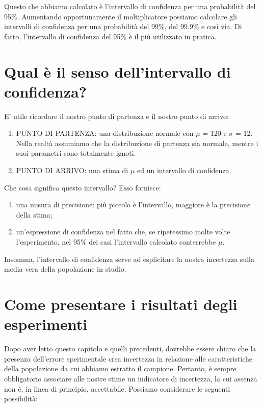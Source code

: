 \documentclass[a4paper,12pt,oneside]{book}
\providecommand{\tightlist}{%
  \setlength{\itemsep}{0pt}\setlength{\parskip}{0pt}}
\begin{document}
Questo che abbiamo calcolato è l'intervallo di confidenza per una probabilità del 95\%. Aumentando opportunamente il moltiplicatore possiamo calcolare gli intervalli di confidenza per una probabilità del 99\%, del 99.9\% e così via. Di fatto, l'intervallo di confidenza del 95\% è il più utilizzato in pratica.

\hypertarget{qual-uxe8-il-senso-dellintervallo-di-confidenza}{%
\section{Qual è il senso dell'intervallo di confidenza?}\label{qual-uxe8-il-senso-dellintervallo-di-confidenza}}

E' utile ricordare il nostro punto di partenza e il nostro punto di arrivo:

\begin{enumerate}
\def\labelenumi{\arabic{enumi}.}
\tightlist
\item
  PUNTO DI PARTENZA: una distribuzione normale con \(\mu\) = 120 e \(\sigma\) = 12. Nella realtà assumiamo che la distribuzione di partenza sia normale, mentre i suoi parametri sono totalmente ignoti.
\item
  PUNTO DI ARRIVO: una stima di \(\mu\) ed un intervallo di confidenza.
\end{enumerate}

Che cosa significa questo intervallo? Esso fornisce:

\begin{enumerate}
\def\labelenumi{\arabic{enumi}.}
\tightlist
\item
  una misura di precisione: più piccolo è l'intervallo, maggiore è la precisione della stima;
\item
  un'espressione di confidenza nel fatto che, se ripetessimo molte volte l'esperimento, nel 95\% dei casi l'intervallo calcolato conterrebbe \(\mu\).
\end{enumerate}

Insomma, l'intervallo di confidenza serve ad esplicitare la nostra incertezza sulla media vera della popolazione in studio.

\hypertarget{come-presentare-i-risultati-degli-esperimenti}{%
\section{Come presentare i risultati degli esperimenti}\label{come-presentare-i-risultati-degli-esperimenti}}

Dopo aver letto questo capitolo e quelli precedenti, dovrebbe essere chiaro che la presenza dell'errore sperimentale crea incertezza in relazione alle caratteristiche della popolazione da cui abbiamo estratto il campione. Pertanto, è sempre obbligatorio associare alle nostre stime un indicatore di incertezza, la cui assenza non è, in linea di principio, accettabile. Possiamo considerare le seguenti possibilità:
\end{document}
